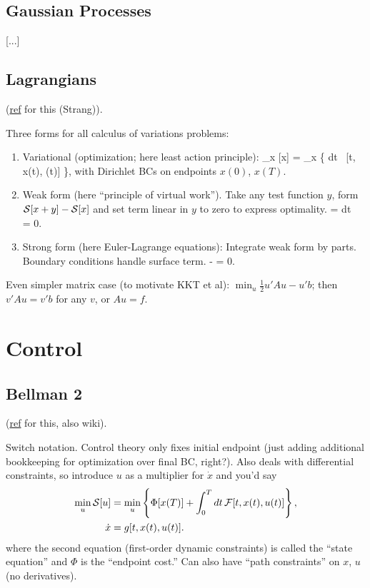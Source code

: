 \documentclass[notitlepage,openany,11pt]{report}
\theoremstyle{plain}%
\numberwithin{equation}{section}
\begin{document}
\subsection{Gaussian Processes}

[...]


\subsection{Lagrangians}
(\href{http://math.mit.edu/classes/18.086/2006/am72.pdf}{ref} for this (Strang)). 

Three forms for all calculus of variations problems:
\begin{enumerate}
\item Variational (optimization; here least action principle):
\be
\min_{x} [x] = \min_{x} \left\{ \int \! dt \, [t, x(t), (t)] \right\},
\ee with Dirichlet BCs on endpoints $x(0)$, $x(T)$. 
\item Weak form (here ``principle of virtual work''). Take any test function $y$, form $\mathcal{S}[x+y] - \mathcal{S}[x]$ and set term linear in $y$ to zero to express optimality. 
\be
\delta {} = \int dt \, = 0.
\ee
\item Strong form (here Euler-Lagrange equations): Integrate weak form by parts. Boundary conditions handle surface term.
\be
{} -   = 0.
\ee
\end{enumerate}
Even simpler matrix case (to motivate KKT et al): $\min_{u} \tfrac{1}{2} u' A u - u' b$; then $v' A u = v' b$ for any $v$, or $Au = f$.


\section{Control}

\subsection{Bellman 2}
(\href{https://math.stackexchange.com/questions/782621/difference-between-variation-of-calculus-problems-and-control-theory-problems}{ref} for this, also wiki). 

Switch notation. Control theory only fixes initial endpoint (just adding additional bookkeeping for optimization over final BC, right?). Also deals with differential constraints, so introduce $u$ as a multiplier for $\dot{x}$ and you'd say
\begin{align*}
\min_{u} \mathcal{S}[u] &= \min_{u}\left\{ \Phi[x(T)] + \int_{0}^{T} dt \, \mathcal{F}[t, x(t), u(t)] \right\}, \\
\dot{x} &= g[t, x(t), u(t)].
\end{align*}
where the second equation (first-order dynamic constraints) is called the ``state equation'' and $\Phi$ is the ``endpoint cost.'' Can also have ``path constraints'' on $x$, $u$ (no derivatives).
\end{document}
